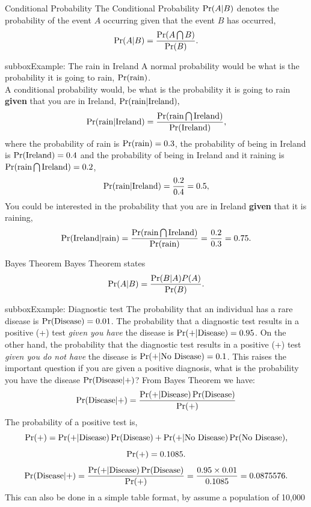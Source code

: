 \documentclass[10pt,a4paper]{article}
\def\Pr{\mathop{\rm Pr}}
\begin{document}
\begin{multicols}{3}
\begin{textbox}{Conditional Probability}
 The Conditional Probability $\Pr(A|B)$ denotes the probability of the event $A$ occurring given that the event $B$ has occurred,
\[ \Pr(A|B)=\frac{\Pr(A\bigcap B)}{\Pr(B)}.\]
\begin{subbox}{subbox}{Example: The rain in Ireland}
\tiny
A normal probability would be what is the probability it is going to rain, $\Pr(\text{rain})$.\\
A conditional probability would, be what is the probability it is going to rain \textbf{given} that you are in Ireland, $\Pr(\text{rain}|\text{Ireland}),$
\[ \Pr(\text{rain}|\text{Ireland})=\frac{\Pr(\text{rain}\bigcap \text{Ireland})}{\Pr(\text{Ireland})},\]
where the probability of rain is $\Pr(\text{rain})=0.3$, the probability of being in Ireland is $\Pr(\text{Ireland})=0.4$ and the probability of being in Ireland and it raining is $\Pr(\text{rain}\bigcap \text{Ireland})=0.2$,
\[ \Pr(\text{rain}|\text{Ireland})=\frac{0.2}{0.4}=0.5,\]
You could be interested in the probability that you are in Ireland \textbf{given} that it is raining, 
\[ \Pr(\text{Ireland}|\text{rain})=\frac{\Pr(\text{rain}\bigcap \text{Ireland})}{\Pr(\text{rain})}=\frac{0.2}{0.3}=0.75.\]
\end{subbox}
\end{textbox}
\begin{textbox}{Bayes Theorem}
 Bayes Theorem states  
\[ \Pr(A|B)=\frac{\Pr(B|A)P(A)}{\Pr(B)}.\]
\begin{subbox}{subbox}{Example: Diagnostic test}
\tiny
The probability that an individual has a rare disease is $\Pr(\text{Disease})=0.01$. The probability that a diagnostic test results in a positive (+) test \textit{given you have} the disease is $\Pr(+|\text{Disease})=0.95$. On the other hand, the probability that the diagnostic test results in a positive (+) test \textit{given you do not have} the disease is $\Pr(+|\text{No Disease})=0.1$. 
This raises the important question if you are given a positive diagnosis, what is the probability you have the disease $\Pr(\text{Disease}|+)$? 
From Bayes Theorem we have:
\[ \Pr(\text{Disease}|+)=\frac{\Pr(+|\text{Disease})\Pr(\text{Disease})}{\Pr(+)}\]
The probability of a positive test is,
\[\Pr(+)= \Pr(+|\text{Disease})\Pr(\text{Disease})+\Pr(+|\text{No Disease})\Pr(\text{No Disease}),\]
\[\Pr(+)= 0.1085.\]
\[ \Pr(\text{Disease}|+)=\frac{\Pr(+|\text{Disease})\Pr(\text{Disease})}{\Pr(+)}=\frac{0.95\times 0.01}{0.1085}=0.0875576.\]
This can also be done in a simple table format, by assume a population of 10,000 

\end{subbox}
\end{textbox}
\end{multicols}
\end{document}
